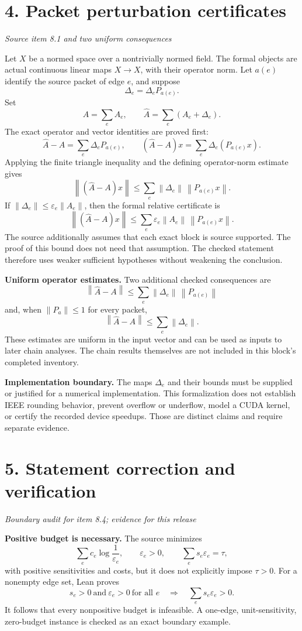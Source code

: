\documentclass[11pt]{article}
\newcommand{\norm}[1]{\left\lVert#1\right\rVert}
\newcommand{\pageheading}[2]{\section*{\color{ink}#1}\textit{#2}\par}
\begin{document}
\newpage
\pageheading{4. Packet perturbation certificates}{Source item 8.1 and two uniform consequences}
Let $X$ be a normed space over a nontrivially normed field. The formal objects are actual continuous linear maps $X\to X$, with their operator norm. Let $a(e)$ identify the source packet of edge $e$, and suppose
\[
\Delta_e=\Delta_e P_{a(e)}.
\]
Set
\[
A=\sum_e A_e,\qquad \widehat A=\sum_e(A_e+\Delta_e).
\]
The exact operator and vector identities are proved first:
\[
\widehat A-A=\sum_e\Delta_e P_{a(e)},\qquad
(\widehat A-A)x=\sum_e\Delta_e(P_{a(e)}x).
\]
Applying the finite triangle inequality and the defining operator-norm estimate gives
\[
\boxed{
\norm{(\widehat A-A)x}
\le\sum_e\norm{\Delta_e}\,\norm{P_{a(e)}x}.
}
\]
If $\norm{\Delta_e}\le\varepsilon_e\norm{A_e}$, then the formal relative certificate is
\[
\boxed{
\norm{(\widehat A-A)x}
\le\sum_e\varepsilon_e\norm{A_e}\,\norm{P_{a(e)}x}.
}
\]
The source additionally assumes that each exact block is source supported. The proof of this bound does not need that assumption. The checked statement therefore uses weaker sufficient hypotheses without weakening the conclusion.

\textbf{Uniform operator estimates.} Two additional checked consequences are
\[
\norm{\widehat A-A}
\le\sum_e\norm{\Delta_e}\,\norm{P_{a(e)}}
\]
and, when $\norm{P_a}\le1$ for every packet,
\[
\boxed{\norm{\widehat A-A}\le\sum_e\norm{\Delta_e}.}
\]
These estimates are uniform in the input vector and can be used as inputs to later chain analyses. The chain results themselves are not included in this block's completed inventory.

\textbf{Implementation boundary.} The maps $\Delta_e$ and their bounds must be supplied or justified for a numerical implementation. This formalization does not establish IEEE rounding behavior, prevent overflow or underflow, model a CUDA kernel, or certify the recorded device speedups. Those are distinct claims and require separate evidence.

\newpage
\pageheading{5. Statement correction and verification}{Boundary audit for item 8.4; evidence for this release}
\textbf{Positive budget is necessary.} The source minimizes
\[
\sum_e c_e\log\frac1{\varepsilon_e},\qquad
\varepsilon_e>0,\qquad \sum_e s_e\varepsilon_e=\tau,
\]
with positive sensitivities and costs, but it does not explicitly impose $\tau>0$. For a nonempty edge set, Lean proves
\[
s_e>0\ \text{and}\ \varepsilon_e>0\ \text{for all }e
\quad\Longrightarrow\quad
\sum_e s_e\varepsilon_e>0.
\]
It follows that every nonpositive budget is infeasible. A one-edge, unit-sensitivity, zero-budget instance is checked as an exact boundary example.
\end{document}
